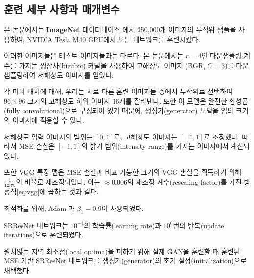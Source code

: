 \documentclass[10pt,twocolumn,letterpaper]{article}
\newcommand{\kor}[1]{#1}
\newcommand{\eng}[1]{}
\begin{document}
\subsection{\eng{Training details and parameters}\kor{훈련 세부 사항과 매개변수}}
\eng{
We trained all networks on a NVIDIA Tesla M40 GPU using a random sample of 350 thousand images from the \textbf{ImageNet} database \cite{russakovsky2014imagenet}.
}\kor{
본 논문에서는 \textbf{ImageNet} 데이터베이스 \cite{russakovsky2014imagenet}에서 350,000개 이미지의 무작위 샘플을 사용하여, NVIDIA Tesla M40 GPU에서 모든 네트워크를 훈련시켰다.
} \eng{
These images are distinct from the testing images. We obtained the \ac{LR} images by downsampling the \ac{HR} images (BGR, $C=3$) using bicubic kernel with downsampling factor $r=4$.
}\kor{
이러한 이미지들은 테스트 이미지들과는 다르다. 본 논문에서는 $r=4$인 다운샘플링 계수를 가지는 쌍삼차(bicubic) 커널을 사용하여 \ac{고해상도} 이미지 (BGR, $C=3$)를 다운샘플링하여 \ac{저해상도} 이미지를 얻었다.
} \eng{
For each mini-batch we crop 16 random $96\times96$ \ac{HR} sub images of distinct training images. Note that we can apply the generator model to images of arbitrary size as it is fully convolutional.
}\kor{
각 미니 배치에 대해, 우리는 서로 다른 훈련 이미지들 중에서 무작위로 선택하여 $96\times96$ 크기의 \ac{고해상도} 하위 이미지 16개를 잘라낸다. 또한 이 모델은 완전한 합성곱(fully convolutional)으로 구성되어 있기 때문에, 생성기(generator) 모델을 임의 크기의 이미지에 적용할 수 있다.
}
\eng{
We scaled the range of the \ac{LR} input images to $[0, 1]$ and for the \ac{HR} images to $[-1, 1]$. The \ac{MSE} loss was thus calculated on images of intensity range $[-1, 1]$.
}\kor{
\ac{저해상도} 입력 이미지의 범위는 $[0, 1]$로, \ac{고해상도} 이미지는 $[-1, 1]$로 조정했다. 따라서 \ac{MSE} 손실은 $[-1, 1]$의 밝기 범위(intensity range)를 가지는 이미지에서 계산되었다.
} \eng{
VGG feature maps were also rescaled by a factor of $\frac{1}{12.75}$ to obtain VGG losses of a scale that is comparable to the \ac{MSE} loss. This is equivalent to multiplying Equation \ref{eq:vgg} with a rescaling factor of $\approx0.006$.
}\kor{
또한 VGG 특징 맵은 \ac{MSE} 손실과 비교 가능한 크기의 VGG 손실을 획득하기 위해 $\frac{1}{12.75}$의 비율로 재조정되었다. 이는 $\approx0.006$의 재조정 계수(rescaling factor)를 가진 방정식\ref{eq:vgg}에 곱하는 것과 같다.
}
\eng{
For optimization we use Adam \cite{Kingma2014} with $\beta_1=0.9$.
}\kor{
최적화를 위해, Adam \cite{Kingma2014}과 $\beta_1=0.9$이 사용되었다.
} \eng{
The SRResNet networks were trained with a learning rate of $10^{-4}$ and $10^{6}$ update iterations.
}\kor{
SRResNet 네트워크는 $10^{-4}$의 학습률(learning rate)과 $10^{6}$번의 반복(update iterations)으로 훈련되었다.
} \eng{
We employed the trained \ac{MSE}-based SRResNet network as initialization for the generator when training the actual \ac{GAN} to avoid undesired local optima.
}\kor{
원치않는 지역 최소점(local optima)을 피하기 위해 실제 \ac{GAN}을 훈련할 때 훈련된 \ac{MSE} 기반 SRResNet 네트워크를 생성기(generator)의 초기 설정(initialization)으로 채택했다.
}
\end{document}
